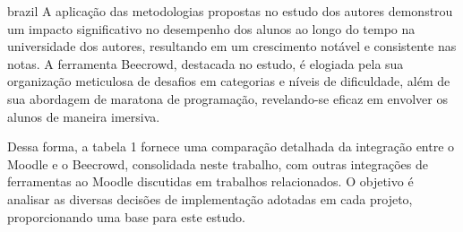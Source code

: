 \begin{otherlanguage*}{brazil}
A aplicação das metodologias propostas no estudo dos autores demonstrou um impacto significativo no desempenho dos alunos ao longo do tempo na universidade dos autores, resultando em um crescimento notável e consistente nas notas. A ferramenta Beecrowd, destacada no estudo, é elogiada pela sua organização meticulosa de desafios em categorias e níveis de dificuldade, além de sua abordagem de maratona de programação, revelando-se eficaz em envolver os alunos de maneira imersiva.

Dessa forma, a tabela 1 fornece uma comparação detalhada da integração entre o Moodle e o Beecrowd, consolidada neste trabalho, com outras integrações de ferramentas ao Moodle discutidas em trabalhos relacionados. O objetivo é analisar as diversas decisões de implementação adotadas em cada projeto, proporcionando uma base para este estudo.

\begin{table}[htb]
      \end{table}


\end{otherlanguage*}
